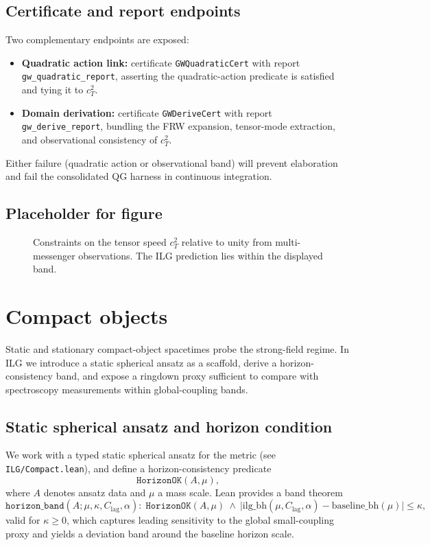 \documentclass[aps,prd,twocolumn,superscriptaddress,nofootinbib,floatfix,longbibliography]{revtex4-2}
\newcommand{\lean}[1]{\texttt{#1}}
\begin{document}
\subsection{Certificate and report endpoints}
Two complementary endpoints are exposed:
\begin{itemize}
  \item \textbf{Quadratic action link:} certificate \lean{GWQuadraticCert} with report \lean{gw_quadratic_report}, asserting the quadratic-action predicate is satisfied and tying it to $c_T^2$.
  \item \textbf{Domain derivation:} certificate \lean{GWDeriveCert} with report \lean{gw_derive_report}, bundling the FRW expansion, tensor-mode extraction, and observational consistency of $c_T^2$.
\end{itemize}
Either failure (quadratic action or observational band) will prevent elaboration and fail the consolidated QG harness in continuous integration.

\subsection{Placeholder for figure}
\begin{figure}[t]
  \centering
  \caption{Constraints on the tensor speed $c_T^2$ relative to unity from multi-messenger observations. The ILG prediction lies within the displayed band.}
  \label{fig:gw-ct2}
\end{figure}

\section{Compact objects}\label{sec:compact}

Static and stationary compact-object spacetimes probe the strong-field regime. In ILG we introduce a static spherical ansatz as a scaffold, derive a horizon-consistency band, and expose a ringdown proxy sufficient to compare with spectroscopy measurements within global-coupling bands.

\subsection{Static spherical ansatz and horizon condition}
We work with a typed static spherical ansatz for the metric (see \texttt{ILG/Compact.lean}), and define a horizon-consistency predicate
\begin{equation}
  \texttt{HorizonOK}(A,\mu),
\end{equation}
where $A$ denotes ansatz data and $\mu$ a mass scale. Lean provides a band theorem
\begin{equation}
  \texttt{horizon\_band}(A;\mu,\kappa,C_{\mathrm{lag}},\alpha):\;
  \texttt{HorizonOK}(A,\mu)\ \wedge\
  \bigl\lvert \mathrm{ilg\_bh}(\mu,C_{\mathrm{lag}},\alpha)-\mathrm{baseline\_bh}(\mu)\bigr\rvert\le\kappa,
\end{equation}
valid for $\kappa\ge 0$, which captures leading sensitivity to the global small-coupling proxy and yields a deviation band around the baseline horizon scale.
\end{document}
